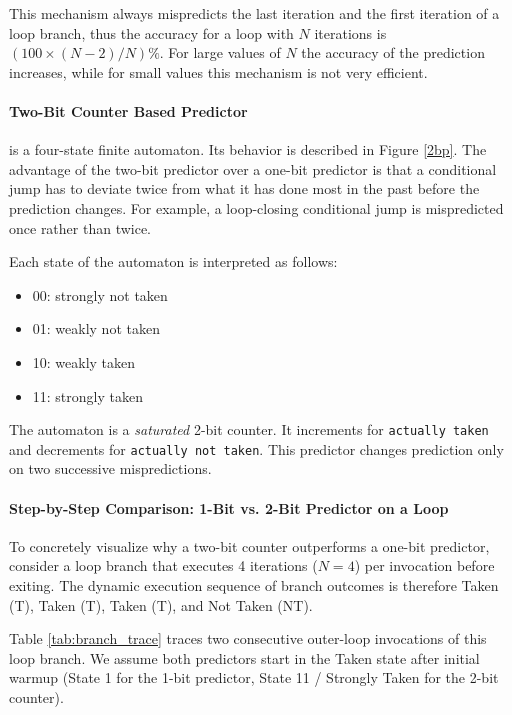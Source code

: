 

This mechanism always mispredicts the last iteration and the first iteration of a loop branch, thus the accuracy for a loop with $N$ iterations is $(100 \times (N-2)/N)\%$. For large values of $N$ the accuracy of the prediction increases, while for small values this mechanism is not very efficient.


\paragraph{Two-Bit Counter Based Predictor} is a four-state finite automaton. Its behavior is described in Figure \ref{2bp}. The advantage of the two-bit predictor over a one-bit predictor is that a conditional jump has to deviate twice from what it has done most in the past before the prediction changes. For example, a loop-closing conditional jump is mispredicted once rather than twice.

Each state of the automaton is interpreted as follows:
\begin{itemize}
    \item 00: strongly not taken
    \item 01: weakly not taken
    \item 10: weakly taken
    \item 11: strongly taken
\end{itemize}


The automaton is a {\em saturated} 2-bit counter. It increments for {\tt actually taken} and decrements for {\tt actually not taken}. This predictor changes prediction only on two successive mispredictions.

\paragraph{Step-by-Step Comparison: 1-Bit vs. 2-Bit Predictor on a Loop}
To concretely visualize why a two-bit counter outperforms a one-bit predictor, consider a loop branch that executes 4 iterations ($N = 4$) per invocation before exiting. The dynamic execution sequence of branch outcomes is therefore Taken (T), Taken (T), Taken (T), and Not Taken (NT).

Table \ref{tab:branch_trace} traces two consecutive outer-loop invocations of this loop branch. We assume both predictors start in the Taken state after initial warmup (State 1 for the 1-bit predictor, State 11 / Strongly Taken for the 2-bit counter).

